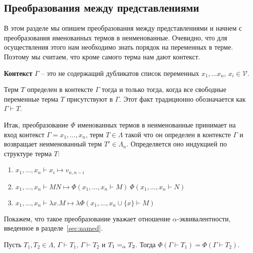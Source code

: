 \subsection{Преобразования между представлениями}

В этом разделе мы опишем преобразования между представлениями и начнем с преобразования именованных термов в неименованные. Очевидно, что для осуществления этого нам необходимо знать порядок на переменных в терме. Поэтому мы считаем, что кроме самого терма нам дают контекст.

\begin{definition}
  \textbf{Контекст} $\Gamma$ -- это не содержащий дубликатов список переменных $x_{1}, \dots x_{n}$, $x_{i} \in \mathcal{V}$.
\end{definition}

\begin{definition}
  Терм $T$ определен в контексте $\Gamma$ тогда и только тогда, когда все свободные переменные терма $T$ присутствуют в $\Gamma$. Этот факт традиционно обозначается как $\Gamma \vdash T$.
\end{definition}

Итак, преобразование $\Phi$ именованных термов в неименованные принимает на вход контекст $\Gamma = x_{1}, \dots, x_{n}$, терм $T \in \Lambda$  такой что он определен в контексте $\Gamma$ и возвращает неименованный терм $T' \in \Lambda_{n}$. Определяется оно индукцией по структуре терма $T$:

\begin{enumerate}
  \item $x_{1}, \dots, x_{n} \vdash x_{i} \mapsto v_{n, n - i}$
  \item $x_{1}, \dots, x_{n} \vdash M N \mapsto \Phi(x_{1}, \dots, x_{n} \vdash M)\ \Phi(x_{1}, \dots, x_{n} \vdash N)$
  \item $x_{1}, \dots, x_{n} \vdash \lambda x.M \mapsto \lambda \Phi(x_{1}, \dots, x_{n} \cup \{x\} \vdash M)$
\end{enumerate}

Покажем, что такое преобразование уважает отношение $\alpha$-эквивалентности, введенное в разделе~\ref{sec:named}.

\begin{prop}
  Пусть $T_{1}, T_{2} \in \Lambda$, $\Gamma \vdash T_{1}$, $\Gamma \vdash T_{2}$ и $T_{1} =_{\alpha} T_{2}$. Тогда $\Phi(\Gamma \vdash T_{1}) = \Phi(\Gamma \vdash T_{2})$.
\end{prop}

